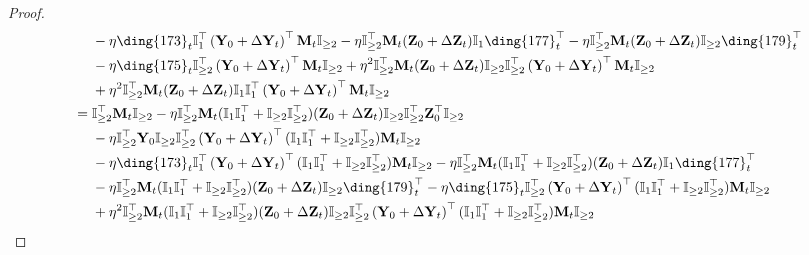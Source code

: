 \documentclass{article}
\theoremstyle{plain}
\theoremstyle{remark}
\def\bY{\mathbf{Y}}
\def\bZ{\mathbf{Z}}
\newcommand{\cc}[1]{\text{\ding{\number\numexpr#1 + 171\relax}}}
\begin{document}
\begin{proof}
\begin{align*}
        &~~~~ -\eta \cc{2}_t \mathbb{I}_{1}^\top\left(\bY_0+\Delta\bY_t\right)^\top\mathbf{M}_{t}\mathbb{I}_{\ge 2} - \eta \mathbb{I}_{\ge 2}^\top\mathbf{M}_{t}(\bZ_0+\Delta\bZ_t)\mathbb{I}_1\cc{6}_t^\top - \eta\mathbb{I}_{\ge 2}^\top\mathbf{M}_{t}(\bZ_0+\Delta\bZ_t)\mathbb{I}_{\ge 2}\cc{8}_t^\top \\
        &~~~~ -\eta \cc{4}_t \mathbb{I}_{\ge 2}^\top\left(\bY_0+\Delta\bY_t\right)^\top \mathbf{M}_{t}\mathbb{I}_{\ge 2} + \eta^2 \mathbb{I}_{\ge 2}^\top\mathbf{M}_{t}(\bZ_0+\Delta\bZ_t)\mathbb{I}_{\ge 2}\mathbb{I}_{\ge 2}^\top\left(\bY_0+\Delta\bY_t\right)^\top \mathbf{M}_{t}\mathbb{I}_{\ge 2} \\
        &~~~~ + \eta^2 \mathbb{I}_{\ge2}^\top\mathbf{M}_{t}(\bZ_0+\Delta\bZ_t)\mathbb{I}_{1}\mathbb{I}_{1}^\top\left(\bY_0+\Delta\bY_t\right)^\top \mathbf{M}_{t}\mathbb{I}_{\ge 2}\\ 
        &= 
            \mathbb{I}_{\ge2}^\top\mathbf{M}_{t}\mathbb{I}_{\ge2} 
            - \eta\mathbb{I}_{\ge 2}^\top \mathbf{M}_{t}(\mathbb{I}_{1}\mathbb{I}_{1}^\top+\mathbb{I}_{\ge 2}\mathbb{I}_{\ge 2}^\top) (\bZ_0+\Delta\bZ_t)\mathbb{I}_{\ge 2}\mathbb{I}_{\ge2}^\top \bZ_0^\top\mathbb{I}_{\ge2}
        \\
        &~~~~ 
            - \eta \mathbb{I}_{\ge2}^\top \bY_0 \mathbb{I}_{\ge2}\mathbb{I}_{\ge 2}^\top \left(\bY_0+\Delta\bY_t\right)^\top (\mathbb{I}_{1}\mathbb{I}_{1}^\top+\mathbb{I}_{\ge 2}\mathbb{I}_{\ge 2}^\top)\mathbf{M}_{t} \mathbb{I}_{\ge 2} 
         \\
        &~~~~ 
            -\eta \cc{2}_t \mathbb{I}_{1}^\top\left(\bY_0+\Delta\bY_t\right)^\top(\mathbb{I}_{1}\mathbb{I}_{1}^\top+\mathbb{I}_{\ge 2}\mathbb{I}_{\ge 2}^\top)\mathbf{M}_{t}\mathbb{I}_{\ge 2} 
            - \eta \mathbb{I}_{\ge 2}^\top\mathbf{M}_{t}(\mathbb{I}_{1}\mathbb{I}_{1}^\top+\mathbb{I}_{\ge 2}\mathbb{I}_{\ge 2}^\top)(\bZ_0+\Delta\bZ_t)\mathbb{I}_1\cc{6}_t^\top 
        \\
        &~~~~ 
            -\eta\mathbb{I}_{\ge 2}^\top\mathbf{M}_{t}(\mathbb{I}_{1}\mathbb{I}_{1}^\top+\mathbb{I}_{\ge 2}\mathbb{I}_{\ge 2}^\top)(\bZ_0+\Delta\bZ_t)\mathbb{I}_{\ge 2}\cc{8}_t^\top
            -\eta \cc{4}_t \mathbb{I}_{\ge 2}^\top\left(\bY_0+\Delta\bY_t\right)^\top (\mathbb{I}_{1}\mathbb{I}_{1}^\top+\mathbb{I}_{\ge 2}\mathbb{I}_{\ge 2}^\top)\mathbf{M}_{t}\mathbb{I}_{\ge 2} 
        \\
        &~~~~ 
            + \eta^2 \mathbb{I}_{\ge 2}^\top\mathbf{M}_{t}(\mathbb{I}_{1}\mathbb{I}_{1}^\top+\mathbb{I}_{\ge 2}\mathbb{I}_{\ge 2}^\top)(\bZ_0+\Delta\bZ_t)\mathbb{I}_{\ge 2}\mathbb{I}_{\ge 2}^\top\left(\bY_0+\Delta\bY_t\right)^\top (\mathbb{I}_{1}\mathbb{I}_{1}^\top+\mathbb{I}_{\ge 2}\mathbb{I}_{\ge 2}^\top)\mathbf{M}_{t}\mathbb{I}_{\ge 2}

\end{align*}
\end{proof}
\end{document}
